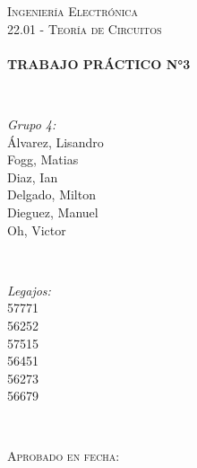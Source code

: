 \begin{titlepage}
\textsc{\Large Ingeniería Electrónica }\\[0.3cm]
\textsc{\large 22.01 - Teoría de Circuitos}\\[0.5cm] %


\HRule \\[0.4cm]
{ \huge \bfseries TRABAJO PRÁCTICO N°3\\ [0.3cm]}

\HRule \\[1.5cm]

 

\begin{minipage}{0.4\textwidth}
\begin{flushleft} \large
\emph{Grupo 4:}\\
Álvarez, Lisandro \\Fogg, Matias\\ Diaz, Ian\\Delgado, Milton\\Dieguez, Manuel\\Oh, Victor %
\end{flushleft}
\end{minipage}
~
\begin{minipage}{0.4\textwidth}
\begin{flushright} \large
\emph{Legajos:} \\
57771\\56252\\57515\\56451\\56273\\56679 
\end{flushright}
\end{minipage}\\[1cm]


 \begin{flushleft}
\textsc{\large Aprobado en fecha:  \dotfill}\\[0.5cm] 




\end{flushleft}
\end{titlepage}
